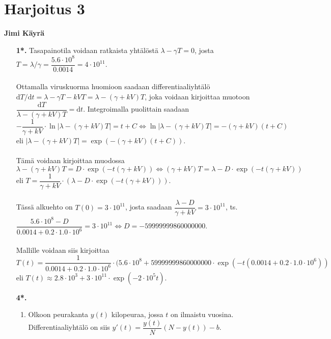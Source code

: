\documentclass[12pt,fleqn]{article}
\begin{document}
\section*{Harjoitus 3}
\textbf{Jimi Käyrä}\\
\begin{enumerate}[label=\textbf{\arabic*.}]
\item [\textbf{1*.}] Tasapainotila voidaan ratkaista yhtälöstä \(\lambda-\gamma T=0\), josta \(T=\lambda /\gamma =\dfrac{5.6\cdot 10^8}{0.0014}=4\cdot 10^{11}\).\\
 \\
Ottamalla viruskuorma huomioon saadaan differentiaaliyhtälö \(\text{d}T/\text{d}t=\lambda -\gamma T-kVT=\lambda-(\gamma+kV)T\), joka voidaan kirjoittaa muotoon \(\dfrac{\text{d}T}{\lambda-(\gamma+kV)T}=\text{d}t\). Integroimalla puolittain saadaan \(-\dfrac{1}{\gamma+kV} \cdot \ln |\lambda-(\gamma+kV)T|=t+C \iff \ln |\lambda-(\gamma +kV)T|=-(\gamma +kV)(t+C)\) eli \(|\lambda -(\gamma + kV)T|=\exp (-(\gamma +kV)(t+C))\).\\
 \\
Tämä voidaan kirjoittaa muodossa \(\lambda-(\gamma +kV)T=D\cdot \exp (-t(\gamma+kV)) \iff (\gamma +kV)T=\lambda - D\cdot \exp (-t(\gamma +kV))\) eli  \(T=\dfrac{1}{\gamma + kV}\cdot (\lambda - D\cdot \exp(-t(\gamma +kV)))\).\\
 \\
Tässä alkuehto on \(T(0)=3\cdot 10^{11}\), josta saadaan \(\dfrac{\lambda -D}{\gamma+kV}=3\cdot 10^{11}\), ts. \(\dfrac{5.6\cdot 10^8-D}{0.0014+0.2\cdot 1.0\cdot 10^6}=3\cdot 10^{11}\iff D=-59 999 999 860 000 000\).\\
 \\
Mallille voidaan siis kirjoittaa \(T(t)=\dfrac{1}{0.0014+0.2\cdot 1.0\cdot 10^6}\cdot (5.6\cdot 10^8+59 999 999 860 000 000\cdot \exp(-t(0.0014+0.2\cdot 1.0\cdot 10^6))\) eli \(T(t)\approx 2.8\cdot 10^3+3\cdot 10^{11}\cdot \exp(-2\cdot 10^5 t)\).




\item [\textbf{4*.}]
\begin{enumerate}[label=\textbf{\alph*)}]
\item Olkoon peurakanta \(y(t)\) kilopeuraa, jossa \(t\) on ilmaistu vuosina. Differentiaaliyhtälö on siis \(y'(t)=\dfrac{y(t)}{N}(N-y(t))-b\).


\end{enumerate}
\end{enumerate}
\end{document}
